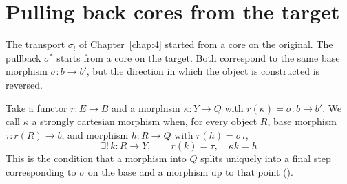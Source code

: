 \section{Pulling back cores from the target}\label{sec:5.2}

The transport $\sigma_!$ of Chapter~\ref{chap:4} started from a core on the original. The
pullback $\sigma^*$ starts from a core on the target. Both correspond to the same base
morphism $\sigma:b\to b'$, but the direction in which the object is constructed is reversed.

\begin{definition}\label{def:5.4}

Take a functor $r:E\to B$ and a morphism $\kappa:Y\to Q$ with $r(\kappa)=\sigma:b\to b'$. We
call $\kappa$ a strongly cartesian morphism when, for every object $R$, base morphism
$\tau:r(R)\to b$, and morphism $h:R\to Q$ with $r(h)=\sigma\tau$,
\begin{equation*}
\exists!\,k:R\longrightarrow Y,\qquad
r(k)=\tau,\quad \kappa k=h
\tag{5.7}\label{eq:5.7}
\end{equation*}
This is the condition that a morphism into $Q$ splits uniquely into a final step
corresponding to $\sigma$ on the base and a morphism up to that point
(\cite[\href{https://stacks.math.columbia.edu/tag/02XJ}{Tag 02XJ, Definition 4.33.1}]{Stacks}).

\end{definition}

